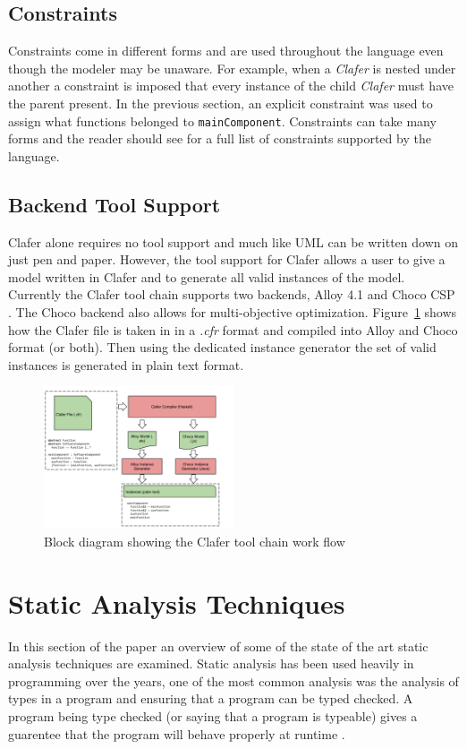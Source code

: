 \documentclass[10pt,oneside]{IEEEtran}
\begin{document}
\subsection{Constraints}
Constraints come in different forms and are used throughout the language even though the modeler may be
unaware. For example, when a \textit{Clafer} is nested under another a constraint is imposed that every
instance of the child \textit{Clafer} must have the parent present. In the previous section, an explicit
constraint was used to assign what functions belonged to \lstinline$mainComponent$. Constraints can
take many forms and the reader should see \cite{1} for a full list of constraints
supported by the language.
\subsection{Backend Tool Support}
Clafer alone requires no tool support and much like UML can be written down on just pen and paper.
However, the tool support for Clafer allows a user to give a model written in Clafer and to generate
all valid instances of the model. Currently the Clafer tool chain supports two backends, Alloy 4.1
\cite{4} and Choco CSP \cite{3}. The Choco backend also allows for
multi-objective optimization. Figure~\ref{fig:claferToolChain} shows how the Clafer file is taken in in a \textit{.cfr} format and compiled into Alloy and Choco format (or both). Then using the dedicated instance generator the set of valid instances is generated in plain text format.
\begin{figure}[h]
  \caption{Block diagram showing the Clafer tool chain work flow}
  \label{fig:claferToolChain}
  \centering
  \includegraphics[width=0.5\textwidth]{ClaferToolChainWorkFlow}
\end{figure}

\section{Static Analysis Techniques}
In this section of the paper an overview of some of the state of the art static analysis techniques
are examined. Static analysis has been used heavily in programming over the years, one of the most
common analysis was the analysis of types in a program and ensuring that a program can be typed checked.
A program being type checked (or saying that a program is typeable) gives a guarentee that the program
will behave properly at runtime \cite{2}.
\end{document}

